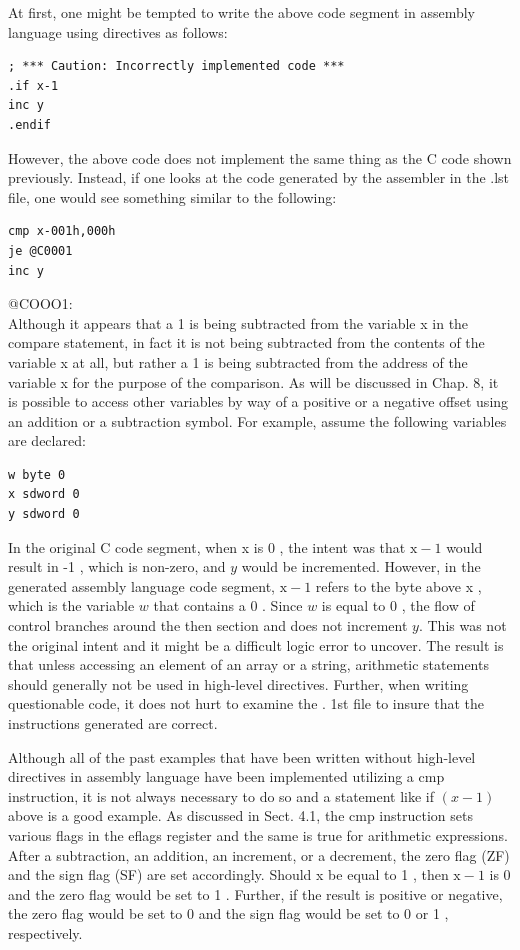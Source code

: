 \documentclass[10pt]{article}
\begin{document}
At first, one might be tempted to write the above code segment in assembly language using directives as follows:

\begin{verbatim}
; *** Caution: Incorrectly implemented code ***
.if x-1
inc y
.endif
\end{verbatim}

However, the above code does not implement the same thing as the C code shown previously. Instead, if one looks at the code generated by the assembler in the .lst file, one would see something similar to the following:

\begin{verbatim}
cmp x-001h,000h
je @C0001
inc y
\end{verbatim}

@COOO1:\\
Although it appears that a 1 is being subtracted from the variable x in the compare statement, in fact it is not being subtracted from the contents of the variable x at all, but rather a 1 is being subtracted from the address of the variable x for the purpose of the comparison. As will be discussed in Chap. 8, it is possible to access other variables by way of a positive or a negative offset using an addition or a subtraction symbol. For example, assume the following variables are declared:

\begin{verbatim}
w byte 0
x sdword 0
y sdword 0
\end{verbatim}

In the original C code segment, when x is 0 , the intent was that $\mathrm{x}-1$ would result in -1 , which is non-zero, and $y$ would be incremented. However, in the generated assembly language code segment, $\mathrm{x}-1$ refers to the byte above x , which is the variable $w$ that contains a 0 . Since $w$ is equal to 0 , the flow of control branches around the then section and does not increment $y$. This was not the original intent and it might be a difficult logic error to uncover. The result is that unless accessing an element of an array or a string, arithmetic statements should generally not be used in high-level directives. Further, when writing questionable code, it does not hurt to examine the . 1st file to insure that the instructions generated are correct.

Although all of the past examples that have been written without high-level directives in assembly language have been implemented utilizing a cmp instruction, it is not always necessary to do so and a statement like if $(x-1)$ above is a good example. As discussed in Sect. 4.1, the cmp instruction sets various flags in the eflags register and the same is true for arithmetic expressions. After a subtraction, an addition, an increment, or a decrement, the zero flag (ZF) and the sign flag (SF) are set accordingly. Should x be equal to 1 , then $\mathrm{x}-1$ is 0 and the zero flag would be set to 1 . Further, if the result is positive or negative, the zero flag would be set to 0 and the sign flag would be set to 0 or 1 , respectively.
\end{document}
